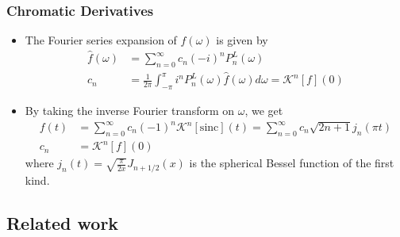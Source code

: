 \documentclass{beamer}
\begin{document}
\begin{frame}
\frametitle{Chromatic Derivatives}
\begin{itemize}
	\item The Fourier series expansion of $\hat{f}(\omega)$ is given by
		 \begin{align*}
			\hat{f}(\omega)	&= \sum_{n=0}^{\infty} c_n (-i)^n P_n^L(\omega) \\
			c_n							&= \frac{1}{2\pi} \int_{-\pi}^{\pi} i^n P_n^L(\omega) \hat{f}(\omega) d\omega
										= \mathcal{K}^n[f](0)
		\end{align*}
	\item By taking the inverse Fourier transform on $\omega$, we get
		\begin{align*}
			f(t)	&= \sum_{n=0}^{\infty} c_n (-1)^n \mathcal{K}^n[\mathrm{sinc}](t)
					= \sum_{n=0}^{\infty} c_n \sqrt{2n+1} j_n(\pi t)\\
			c_n		&= \mathcal{K}^n[f](0)
		\end{align*}
		where $j_n(t) = \sqrt{\frac{\pi}{2x}}J_{n+1/2}(x)$ is the spherical Bessel function of the first kind.
\end{itemize}
\end{frame}




\subsection{Related work}
\end{document}
